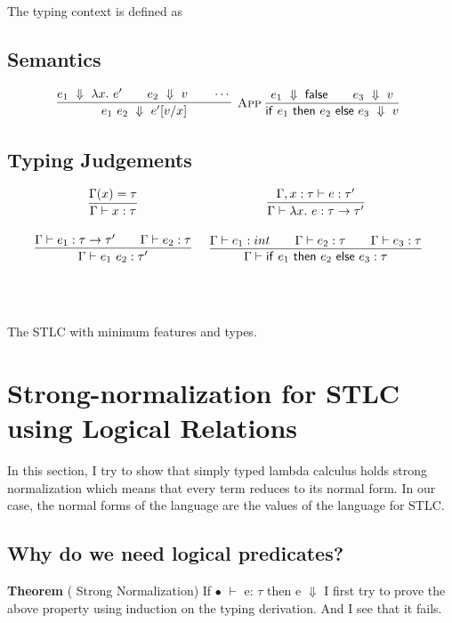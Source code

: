 \documentclass[10pt]{article}
\begin{document}
  The typing context is defined as 
   
   \subsection{Semantics}
  
  

    \begin{gather*}
	\infr[App]
{\dstep{e_1}{\lamdefe{x}{e'}} \iand \dstep{e_2}{v} \iand \cdots}
{\dstep{e_1~e_2}{\subst{x}{v}{e'}}}
  ~
  \infr
  {\dstep{e_1}{\falsev} \iand \dstep{e_3}{v}}
  {\dstep{\ife{e_1}{e_2}{e_3}}{v}}
  \\
  \end{gather*}
  
  \subsection{Typing Judgements}
  \[
  \begin{array}{cc}
  
  \envlookup{\typeEnv}{x}{\tau} 
  &
  \infr
  {\extenvent{x}{\tau}{e}{\tau'}}
  {\envent{\lamdefe{x}{e}}{\funct{\tau}{\tau'}}} 
  \\\\
  \infr
  {\envent{e_1}{\funct{\tau}{\tau'}} \iand 
  	\envent{e_2}{\tau}}
  {\envent{e_1~e_2}{\tau'}} 
  &
   \infr
  {\envent{e_1}{int} \iand \envent{e_2}{\tau} \iand \envent{e_3}{\tau}}
  {\envent{\ife{e_1}{e_2}{e_3}}{\tau}}
  \\\\
 
  &
  
  \\\\
  \end{array}
  \]
  
  
  The STLC with minimum features and types.
  
  
  \newpage
  \section{Strong-normalization for STLC using Logical Relations}
  In this section, I try to show that simply typed lambda calculus holds strong normalization which means that every term reduces to its normal form. In our case, the normal forms of the language are the values of the language for STLC.
  
  \subsection{Why do we need logical predicates?}
  \textbf{Theorem} ( Strong Normalization)
  \newline
  \vskip 0.1in
  If $ \bullet $ $\vdash$ e: $\tau$ then e $\Downarrow$
\vskip 0.2in
I first try to prove the above property using induction on the typing derivation. And I see that it fails.
\vskip 0.1in
\end{document}
